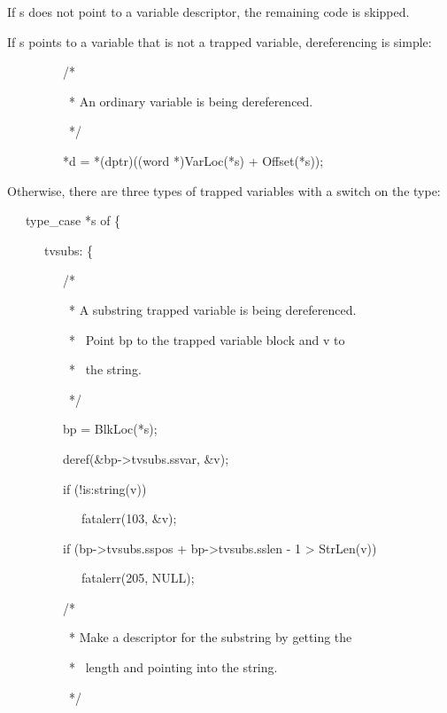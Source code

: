 If s does not point to a variable descriptor, the remaining code is skipped.


If s points to a variable that is not a trapped variable,
dereferencing is simple:

{\ttfamily\mdseries
\ \ \ \ \ \ \ \ \ /*}

{\ttfamily\mdseries
\ \ \ \ \ \ \ \ \ \ * An ordinary variable is being dereferenced.}

{\ttfamily\mdseries
\ \ \ \ \ \ \ \ \ \ */}

{\ttfamily\mdseries
\ \ \ \ \ \ \ \ \ *d = *(dptr)((word *)VarLoc(*s) + Offset(*s));}


Otherwise, there are three types of trapped variables with a switch on the type:

{\ttfamily\mdseries
\ \ \ type\_case *s of \{}

{\ttfamily\mdseries
\ \ \ \ \ \ tvsubs: \{}

{\ttfamily\mdseries
\ \ \ \ \ \ \ \ \ /*}

{\ttfamily\mdseries
\ \ \ \ \ \ \ \ \ \ * A substring trapped variable is being dereferenced.}

{\ttfamily\mdseries
\ \ \ \ \ \ \ \ \ \ * \ Point bp to the trapped variable block and v to}

{\ttfamily\mdseries
\ \ \ \ \ \ \ \ \ \ * \ the string.}

{\ttfamily\mdseries
\ \ \ \ \ \ \ \ \ \ */}

{\ttfamily\mdseries
\ \ \ \ \ \ \ \ \ bp = BlkLoc(*s);}

{\ttfamily\mdseries
\ \ \ \ \ \ \ \ \ deref(\&bp-{\textgreater}tvsubs.ssvar, \&v);}

{\ttfamily\mdseries
\ \ \ \ \ \ \ \ \ if (!is:string(v))}

{\ttfamily\mdseries
\ \ \ \ \ \ \ \ \ \ \ \ fatalerr(103, \&v);}

{\ttfamily\mdseries
\ \ \ \ \ \ \ \ \ if (bp-{\textgreater}tvsubs.sspos + bp-{\textgreater}tvsubs.sslen - 1 {\textgreater} StrLen(v))}

{\ttfamily\mdseries
\ \ \ \ \ \ \ \ \ \ \ \ fatalerr(205, NULL);}

{\ttfamily\mdseries
\ \ \ \ \ \ \ \ \ /*}

{\ttfamily\mdseries
\ \ \ \ \ \ \ \ \ \ * Make a descriptor for the substring by getting the}

{\ttfamily\mdseries
\ \ \ \ \ \ \ \ \ \ * \ length and pointing into the string.}

{\ttfamily\mdseries
\ \ \ \ \ \ \ \ \ \ */}

